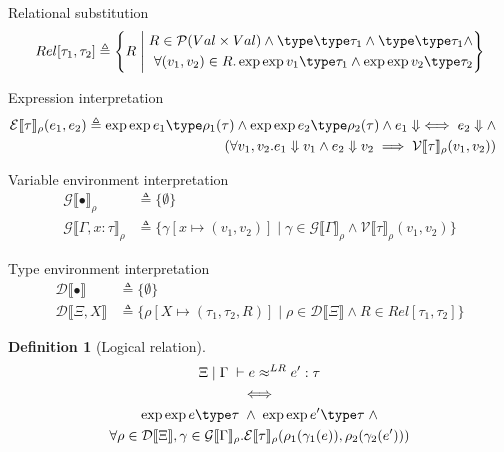 \documentclass[twoside,11pt,openright]{report}
\theoremstyle{definition}
\newtheorem{definition}{Definition}[section]
\newcommand{\var}{x}
\newcommand{\expr}{e}
\newcommand{\val}{v}
\newcommand{\Tvar}{X}
\newcommand{\typ}{\tau}
\newcommand{\venv}{\Gamma}
\newcommand{\tenv}{\Xi}
\newcommand{\empvenv}{\bullet}
\newcommand{\emptenv}{\bullet}
\newcommand{\jdg}[4]{#1 \; | \; #2 \; \vdash #3 : #4}
\newcommand{\jdgType}[3]{#1 \; | \; #2 \; \vdash #3}
\def\envs#1#2\exp#3\type#4{\jdg{#1}{#2}{#3}{#4}} %
\def\envstyp#1#2\type#3{\jdgType{#1}{#2}{#3}} %
\newcommand{\ValInp}[2]{\mathcal{V} \llbracket #1 \rrbracket_{#2}}
\newcommand{\ValInpGen}[2]{\ValInp{#1}{#2}(\val_1, \val_2)}
\newcommand{\ExpInp}[2]{\mathcal{E} \llbracket #1 \rrbracket_{#2}}
\newcommand{\VenvInp}[2]{\mathcal{G} \llbracket #1 \rrbracket_{#2}}
\newcommand{\TenvInp}[1]{\mathcal{D} \llbracket #1 \rrbracket}
\newcommand{\LogRel}[5]{#1 \; | \; #2 \; \vdash #3 \approx^{LR} #4 : #5}
\newcommand{\map}[2]{#1 \mapsto #2}
\begin{document}
Relational substitution
\begin{align*}
  Rel[\typ_1, \typ_2] \triangleq 
  \left\{R \; \middle\vert \;
  \begin{aligned}
    R \in \mathcal{P}(Val \times Val) \land \envstyp \emptenv \empvenv \type \typ_1 \land \envstyp \emptenv \empvenv \type \typ_1 \land\\ \forall (\val_1, \val_2) \in R . \envs \emptenv \empvenv \exp \val_1 \type \typ_1 \land \envs \emptenv \empvenv \exp \val_2 \type \typ_2
  \end{aligned}
  \right\}
\end{align*}

Expression interpretation
\begin{align*}
  \ExpInp{\typ}{\rho}(\expr_1, \expr_2) &\triangleq 
  \begin{aligned}[t]
    \envs \emptenv \empvenv \exp \expr_1 \type \rho_1(\typ) \land \envs \emptenv \empvenv \exp \expr_2 \type \rho_2(\typ) \land \expr_1 \Downarrow \iff \expr_2 \Downarrow \land\\
    (\forall \val_1, \val_2 . \expr_1 \Downarrow \val_1 \land \expr_2 \Downarrow \val_2 \implies \ValInpGen{\typ}{\rho})
  \end{aligned}
\end{align*}

Variable environment interpretation
\begin{align*}
  \VenvInp{\empvenv}{\rho} &\triangleq \{ \emptyset \}\\
  \VenvInp{\venv, \var : \typ}{\rho} &\triangleq \{\gamma[\map{\var}{(\val_1, \val_2)}] \mid \gamma \in \VenvInp{\venv}{\rho} \land \ValInpGen{\typ}{\rho}\}
\end{align*}

Type environment interpretation
\begin{align*}
  \TenvInp{\empvenv} &\triangleq \{ \emptyset \}\\
  \TenvInp{\tenv, \Tvar} &\triangleq \{\rho[\map{\Tvar}{(\typ_1, \typ_2, R)}] \mid \rho \in \TenvInp{\tenv} \land R \in Rel[\typ_1, \typ_2]\}
\end{align*}

\begin{definition}[Logical relation]\label{def:LogRel}
  \begin{equation*}
    \begin{gathered}
      \LogRel{\tenv}{\venv}{\expr}{\expr'}{\typ}\\
      \iff\\
      \envs \tenv \venv \exp \expr \type \typ \; \land \; \envs \tenv \venv \exp \expr' \type \typ \; \land\\
      \forall \rho \in \TenvInp{\tenv}, \gamma \in \VenvInp{\venv}{\rho} . 
      \ExpInp{\typ}{\rho}(\rho_1(\gamma_1(\expr)), \rho_2(\gamma_2(\expr')))
    \end{gathered}
  \end{equation*}
\end{definition}
\end{document}
